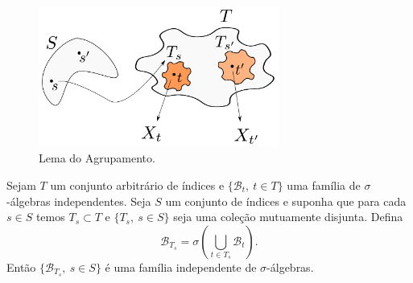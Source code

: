 \begin{center}
\begin{figure}[!htb]
\centering
\includegraphics[width=0.7\textwidth]{Figuras/figura-agrupamento-va-idenpendentes.pdf}
\caption{Lema do Agrupamento.}
\label{Rotulo}
\end{figure}
\end{center}


\begin{lema}
Sejam $T$ um conjunto arbitrário de índices e 
$\{\mathscr{B}_{t},\ t\in T\}$ uma família de 
$\sigma$-álgebras independentes. Seja $S$ 
um conjunto de índices e suponha que 
para cada $s\in S$ temos $T_s\subset T$
e $\{T_s,\ s\in S\}$ seja uma coleção mutuamente disjunta.
Defina 
	\[
		\mathscr{B}_{T_s} 
		=
		\sigma\left(
			\bigcup_{t\in T_s}\mathscr{B}_{t}
		\right).
	\]
Então $\{\mathscr{B}_{T_s},\ s\in S\}$ é uma família 
independente de $\sigma$-álgebras.
\end{lema}

